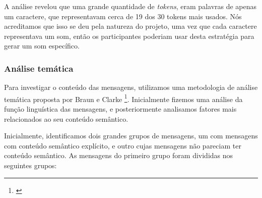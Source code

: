 A análise revelou que uma grande quantidade de \emph{tokens}, eram palavras de apenas um caractere, que representavam cerca de 19 dos 30 tokens mais usados. Nós acreditamos que isso se deu pela natureza do projeto, uma vez que cada caractere representava um som, então os participantes poderiam usar desta estratégia para gerar um som específico. 


\subsubsection{Análise temática}
\label{sec:thematic}

Para investigar o conteúdo das mensagens, utilizamos uma metodologia de análise temática proposta por Braun e Clarke \footnote{\cite{Braun2006}}. Inicialmente fizemos uma análise da função linguística das mensagens, e posteriormente analisamos fatores mais relacionados ao seu conteúdo semântico.



Inicialmente, identificamos dois grandes grupos de mensagens, um com mensagens com conteúdo semântico explícito, e outro cujas mensagens não pareciam ter conteúdo semântico. As mensagens do primeiro grupo foram divididas nos seguintes grupos:


